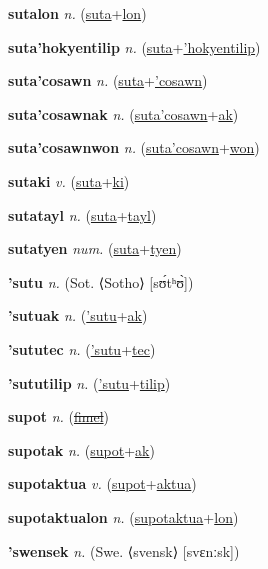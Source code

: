 \textbf{\hypertarget{sutalon}{sutalon}} \textit{n.} (\hyperlink{suta}{suta}+\allowbreak \hyperlink{lon}{lon})


\textbf{\hypertarget{suta'hokyentilip}{suta'hokyentilip}} \textit{n.} (\hyperlink{suta}{suta}+\allowbreak \hyperlink{'hokyentilip}{'hokyentilip})


\textbf{\hypertarget{suta'cosawn}{suta'cosawn}} \textit{n.} (\hyperlink{suta}{suta}+\allowbreak \hyperlink{'cosawn}{'cosawn})


\textbf{\hypertarget{suta'cosawnak}{suta'cosawnak}} \textit{n.} (\hyperlink{suta'cosawn}{suta'cosawn}+\allowbreak \hyperlink{ak}{ak})


\textbf{\hypertarget{suta'cosawnwon}{suta'cosawnwon}} \textit{n.} (\hyperlink{suta'cosawn}{suta'cosawn}+\allowbreak \hyperlink{won}{won})


\textbf{\hypertarget{sutaki}{sutaki}} \textit{v.} (\hyperlink{suta}{suta}+\allowbreak \hyperlink{ki}{ki})


\textbf{\hypertarget{sutatayl}{sutatayl}} \textit{n.} (\hyperlink{suta}{suta}+\allowbreak \hyperlink{tayl}{tayl})


\textbf{\hypertarget{sutatyen}{sutatyen}} \textit{num.} (\hyperlink{suta}{suta}+\allowbreak \hyperlink{tyen}{tyen})


\textbf{\hypertarget{'sutu}{'sutu}} \textit{n.} (Sot. ⟨Sotho⟩ [sʊ́tʰʊ̀])


\textbf{\hypertarget{'sutuak}{'sutuak}} \textit{n.} (\hyperlink{'sutu}{'sutu}+\allowbreak \hyperlink{ak}{ak})


\textbf{\hypertarget{'sututec}{'sututec}} \textit{n.} (\hyperlink{'sutu}{'sutu}+\allowbreak \hyperlink{tec}{tec})


\textbf{\hypertarget{'sututilip}{'sututilip}} \textit{n.} (\hyperlink{'sutu}{'sutu}+\allowbreak \hyperlink{tilip}{tilip})


\textbf{\hypertarget{supot}{supot}} \textit{n.} (\hyperlink{fimel}{\sout{fimel}})


\textbf{\hypertarget{supotak}{supotak}} \textit{n.} (\hyperlink{supot}{supot}+\allowbreak \hyperlink{ak}{ak})


\textbf{\hypertarget{supotaktua}{supotaktua}} \textit{v.} (\hyperlink{supot}{supot}+\allowbreak \hyperlink{aktua}{aktua})


\textbf{\hypertarget{supotaktualon}{supotaktualon}} \textit{n.} (\hyperlink{supotaktua}{supotaktua}+\allowbreak \hyperlink{lon}{lon})


\textbf{\hypertarget{'swensek}{'swensek}} \textit{n.} (Swe. ⟨svensk⟩ [svɛnːsk])


